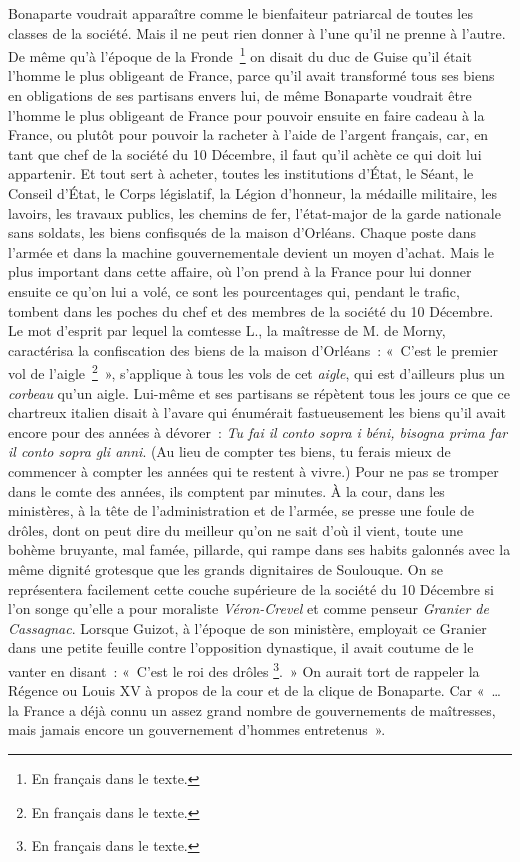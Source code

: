 \documentclass[french,twoside]{book} %
\begin{document}
Bonaparte voudrait apparaître comme le bienfaiteur patriarcal de toutes les classes de la société. Mais il ne peut rien donner à l’une qu’il ne prenne à l’autre. De même qu’à l’époque de la Fronde \footnote{En français dans le texte.} on disait du duc de Guise qu’il était l’homme le plus obligeant de France, parce qu’il avait transformé tous ses biens en obligations de ses partisans envers lui, de même Bonaparte voudrait être l’homme le plus obligeant de France pour pouvoir ensuite en faire cadeau à la France, ou plutôt pour pouvoir la racheter à l’aide de l’argent français, car, en tant que chef de la société du 10 Décembre, il faut qu’il achète ce qui doit lui appartenir. Et tout sert à acheter, toutes les institutions d’État, le Séant, le Conseil d’État, le Corps législatif, la Légion d’honneur, la médaille militaire, les lavoirs, les travaux publics, les chemins de fer, l’état-major de la garde nationale sans soldats, les biens confisqués de la maison d’Orléans. Chaque poste dans l’armée et dans la machine gouvernementale devient un moyen d’achat. Mais le plus important dans cette affaire, où l’on prend à la France pour lui donner ensuite ce qu’on lui a volé, ce sont les pourcentages qui, pendant le trafic, tombent dans les poches du chef et des membres de la société du 10 Décembre. Le mot d’esprit par lequel la comtesse L., la maîtresse de M. de Morny, caractérisa la confiscation des biens de la maison d’Orléans : « C’est le premier vol de l’aigle \footnote{En français dans le texte.} », s’applique à tous les vols de cet \emph{aigle}, qui est d’ailleurs plus un \emph{corbeau} qu’un aigle. Lui-même et ses partisans se répètent tous les jours ce que ce chartreux italien disait à l’avare qui énumérait fastueusement les biens qu’il avait encore pour des années à dévorer : \emph{Tu fai il conto sopra i béni, bisogna prima far il conto sopra gli anni}. (Au lieu de compter tes biens, tu ferais mieux de commencer à compter les années qui te restent à vivre.) Pour ne pas se tromper dans le comte des années, ils comptent par minutes. À la cour, dans les ministères, à la tête de l’administration et de l’armée, se presse une foule de drôles, dont on peut dire du meilleur qu’on ne sait d’où il vient, toute une bohème bruyante, mal famée, pillarde, qui rampe dans ses habits galonnés avec la même dignité grotesque que les grands dignitaires de Soulouque. On se représentera facilement cette couche supérieure de la société du 10 Décembre si l’on songe qu’elle a pour moraliste \emph{Véron-Crevel} et comme penseur \emph{Granier de Cassagnac}. Lorsque Guizot, à l’époque de son ministère, employait ce Granier dans une petite feuille contre l’opposition dynastique, il avait coutume de le vanter en disant : « C’est le roi des drôles \footnote{En français dans le texte.}. » On aurait tort de rappeler la Régence ou Louis XV à propos de la cour et de la clique de Bonaparte. Car « … la France a déjà connu un assez grand nombre de gouvernements de maîtresses, mais jamais encore un gouvernement d’hommes entretenus ».\par
\end{document}
